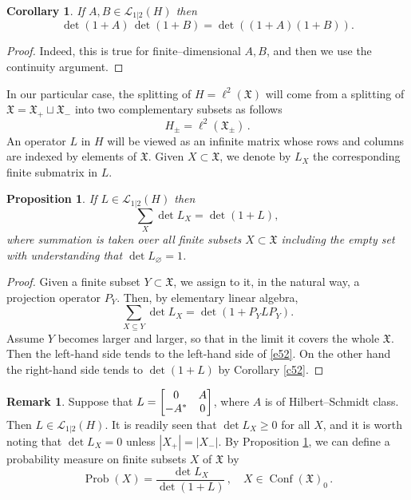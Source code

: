 \documentclass[12pt]{amsart}
\newcommand{\Prob}{\operatorname{Prob}}
\newcommand{\Conf}{\operatorname{Conf}}
\newcommand{\CX}{\Conf(\X)}
\newcommand{\CXf}{\CX_0}
\newcommand{\X}{\mathfrak{X}}
\newcommand{\LH}{\mathcal{L}_{1|2}(H)}
\theoremstyle{plain}
\newtheorem{proposition}[lemma]{Proposition}
\newtheorem{corollary}[lemma]{Corollary}
\theoremstyle{definition}
\newtheorem{remark}[lemma]{Remark}
\numberwithin{equation}{section}
\begin{document}
\begin{corollary}\label{c53} If $A,B\in\LH$ then
%
\begin{equation*}
\det(1+A)\, \det(1+B)=\det((1+A)(1+B)).
\end{equation*}
%
\end{corollary}

\begin{proof} Indeed, this is true for finite--dimensional $A,B$, and then we use 
the continuity argument. 
\end{proof}


In our particular case, the splitting of $H=\ell^2(\X)$
will come from a splitting of $\X=\X_+\sqcup\X_-$ into
two complementary subsets as follows
$$
H_\pm=\ell^2(\X_\pm)\,.
$$
An operator $L$ in $H$ will be viewed as an infinite matrix
whose rows and columns are indexed by elements of $\X$. Given $X\subset\X$, we
denote by $L_X$ the corresponding finite submatrix in $L$. 

\begin{proposition}\label{p54} If $L\in\LH$ then
%
\begin{equation}\label{e52}
\sum_X\det L_X=\det(1+L),
\end{equation}
%
where summation is taken over all finite subsets $X\subset\X$ including the
empty set with understanding that $\det L_\varnothing=1$. 
\end{proposition} 

\begin{proof} Given a finite subset $Y\subset \X$, we assign to it, in the
 natural way, a projection operator $P_Y$. Then, by elementary linear algebra,
%
\begin{equation*}
\sum_{X\subseteq Y}\det L_X=\det(1+P_YLP_Y).
\end{equation*}
%
Assume $Y$ becomes larger and larger, so that in the limit it 
covers the whole $\X$. Then the left-hand side tends to the left-hand side
 of \eqref{e52}. 
On the other hand the right-hand side tends to $\det(1+L)$ by Corollary \ref{c52}.  
\end{proof}

\begin{remark}
Suppose that 
 $L=\bmatrix 0 & A\\ -A^* & 0\endbmatrix$, where $A$ is of Hilbert--Schmidt
class. Then $L\in\LH$. It is readily seen that $\det L_X\ge0$ for all $X$, and it is  worth noting that $\det L_X=0$ unless $|X_+|=|X_-|$. 
By Proposition \ref{p54}, we can define a probability measure 
on finite subsets $X$ of $\X$ by
%
\begin{equation*}
\Prob(X)=\frac{\det L_X}{\det(1+L)}\,, \quad X\in\CXf\,.
\end{equation*}
%
\end{remark} 
\end{document}
